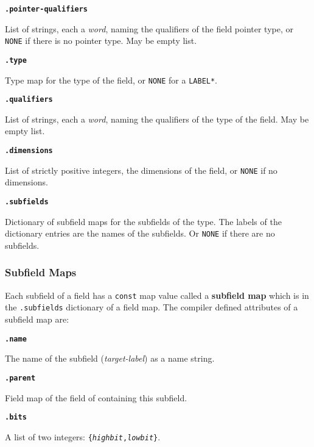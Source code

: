 \documentclass[12pt]{article}
\newcommand{\key}[1]{{\rm \bfseries #1}}
\newcommand{\ttkey}[1]{{\tt \bfseries #1}}
\newenvironment{indpar}[1][0.3in]%
	{\begin{list}{}%
		     {\setlength{\itemsep}{0in}%
		      \setlength{\topsep}{0in}%
		      \setlength{\parsep}{1ex}%
		      \setlength{\labelwidth}{#1}%
		      \setlength{\leftmargin}{#1}%
		      \addtolength{\leftmargin}{\labelsep}}%
	 \item}%
	{\end{list}}
\begin{document}
\ttkey{.pointer-qualifiers}
\begin{indpar}
List of strings, each a {\em word}, naming the qualifiers
of the field pointer type, or {\tt NONE} if there is no
pointer type.  May be empty list.
\end{indpar}

\ttkey{.type}
\begin{indpar}
Type map for the type of the field, or {\tt NONE}
for a {\tt *LABEL*}.
\end{indpar}

\ttkey{.qualifiers}
\begin{indpar}
List of strings, each a {\em word}, naming the qualifiers
of the type of the field.  May be empty list.
\end{indpar}

\ttkey{.dimensions}
\begin{indpar}
List of strictly positive integers, the dimensions of the field, or {\tt NONE}
if no dimensions.
\end{indpar}

\ttkey{.subfields}
\begin{indpar}
Dictionary of subfield maps for the subfields of the type.  The labels
of the dictionary entries are the names of the subfields.
Or {\tt NONE} if there are no subfields.
\end{indpar}

\subsubsection{Subfield Maps}
\label{SUBFIELD-MAPS}

Each subfield of a field has a {\tt const} map value called
a \key{subfield map} which is in the {\tt .subfields} dictionary of
a field map.  The compiler defined attributes of a subfield map are:

\ttkey{.name}
\begin{indpar}
The name of the subfield ({\em target-label})
as a name string.
\end{indpar}

\ttkey{.parent}
\begin{indpar}
Field map of the field of containing this subfield.
\end{indpar}

\ttkey{.bits}
\begin{indpar}
A list of two integers: {\tt \{{\rm \em highbit},{\rm \em lowbit}\}}.
\end{indpar}
\end{document}
